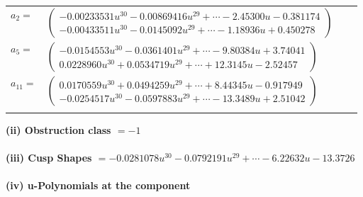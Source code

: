 \documentclass[1p]{elsarticle_modified}
\theoremstyle{definition}
\begin{document}
\begin{tabular}{m{7pt} m{180pt} m{7pt} m{180pt} }
\flushright $a_{2}=$&$\begin{pmatrix}-0.00233531 u^{30}-0.00869416 u^{29}+\cdots-2.45300 u-0.381174\\-0.00433511 u^{30}-0.0145092 u^{29}+\cdots-1.18936 u+0.450278\end{pmatrix}$ \\
\flushright $a_{5}=$&$\begin{pmatrix}-0.0154553 u^{30}-0.0361401 u^{29}+\cdots-9.80384 u+3.74041\\0.0228960 u^{30}+0.0534719 u^{29}+\cdots+12.3145 u-2.52457\end{pmatrix}$ \\
\flushright $a_{11}=$&$\begin{pmatrix}0.0170559 u^{30}+0.0494259 u^{29}+\cdots+8.44345 u-0.917949\\-0.0254517 u^{30}-0.0597883 u^{29}+\cdots-13.3489 u+2.51042\end{pmatrix}$\\&\end{tabular}
\flushleft \textbf{(ii) Obstruction class $= -1$}\\~\\
\flushleft \textbf{(iii) Cusp Shapes $= -0.0281078 u^{30}-0.0792191 u^{29}+\cdots-6.22632 u-13.3726$}\\~\\
\newpage\renewcommand{\arraystretch}{1}
\flushleft \textbf{(iv) u-Polynomials at the component}\newline \\
\end{document}
